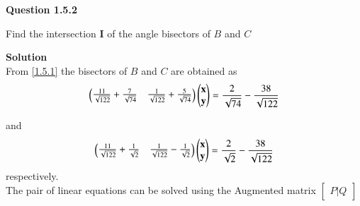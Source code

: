 \documentclass[journal,12pt,twocolumn]{IEEEtran}
\begin{document}
\let\vec\mathbf




\vspace{3cm}

\textbf{Question 1.5.2}
\begin{flushleft}
Find the intersection $\vec{I}$ of the angle bisectors of $B$ and $C$
\end{flushleft}

\begin{flushleft}
\textbf{Solution}\\
From \ref{1.5.1} the bisectors of $B$ and $C$ are obtained as 
\begin{align}
\myvec{
\frac{11}{\sqrt{122}}+\frac{7}{\sqrt{74}} & \frac{1}{\sqrt{122}}+\frac{5}{\sqrt{74}}\\
}
\myvec{
\vec{x}\\
\vec{y}\\
}
=\frac{2}{\sqrt{74}}-\frac{38}{\sqrt{122}}
\end{align}

and 
\begin{align}
\myvec{
\frac{11}{\sqrt{122}}+\frac{1}{\sqrt{2}} & \frac{1}{\sqrt{122}}-\frac{1}{\sqrt{2}}\\
}
\myvec{
\vec{x}\\
\vec{y}\\
}
=\frac{2}{\sqrt{2}}-\frac{38}{\sqrt{122}}
\end{align}
respectively.\\
The pair of linear equations can be solved using the Augmented matrix $\begin{bmatrix}
P|Q
\end{bmatrix}$


\end{flushleft}
\end{document}
